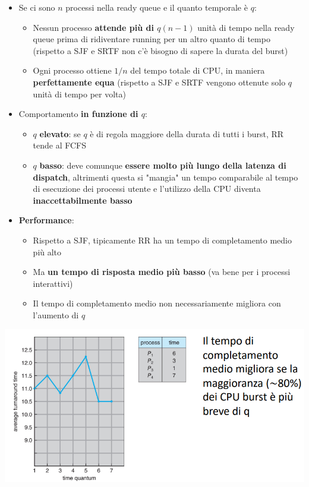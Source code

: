 \documentclass[12pt]{article}
\begin{document}
\begin{itemize}
    \item Se ci sono $n$ processi nella ready queue e il quanto temporale è $q$:
    \begin{itemize}
        \item Nessun processo \textbf{attende più di $q(n-1)$} unità di tempo nella ready queue prima di ridiventare running per un altro quanto di tempo (rispetto a SJF e SRTF non c'è bisogno di sapere la durata del burst)
        \item Ogni processo ottiene $1/n$ del tempo totale di CPU, in maniera \textbf{perfettamente equa} (rispetto a SJF e SRTF vengono ottenute solo $q$ unità di tempo per volta)
    \end{itemize}
    \item Comportamento \textbf{in funzione di $q$}:
    \begin{itemize}
        \item $q$ \textbf{elevato}: se $q$ è di regola maggiore della durata di tutti i burst, RR tende al FCFS
        \item $q$ \textbf{basso}: deve comunque \textbf{essere molto più lungo della latenza di dispatch}, altrimenti questa si "mangia" un tempo comparabile al tempo di esecuzione dei processi utente e l'utilizzo della CPU diventa \textbf{inaccettabilmente basso}
    \end{itemize}
    \item \textbf{Performance}:
    \begin{itemize}
        \item Rispetto a SJF, tipicamente RR ha un tempo di completamento medio più alto
        \item Ma \textbf{un tempo di risposta medio più basso} (va bene per i processi interattivi)
        \item Il tempo di completamento medio non necessariamente migliora con l'aumento di $q$
    \end{itemize}
\end{itemize}
\begin{center}
    \includegraphics[width = 0.90\linewidth]{Images/48.png}
\end{center}
\end{document}
